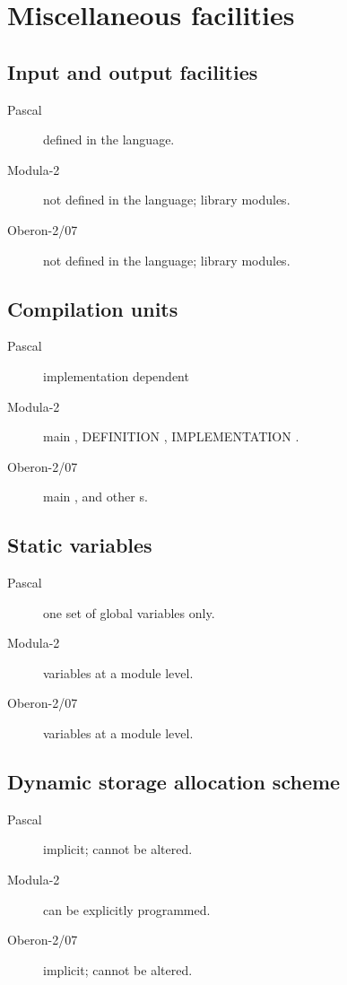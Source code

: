 \documentclass[10pt]{article}
\begin{document}
\section{Miscellaneous facilities}

\subsection{Input and output facilities}
\begin{description}
    \item[Pascal] defined in the language.
    
    \item[Modula-2] not defined in the language; library modules.
    
    \item[Oberon-2/07] not defined in the language; library modules.
\end{description}

\subsection{Compilation units}
\begin{description}
    \item[Pascal] implementation dependent
    
    \item[Modula-2] main \MODULE, DEFINITION \MODULE, IMPLEMENTATION \MODULE.
    
    \item[Oberon-2/07] main \MODULE, and other  \MODULE s.
\end{description}

\subsection{Static variables}
\begin{description}
    \item[Pascal]  one set of global variables only.
    
    \item[Modula-2] variables at a module level.
    
    \item[Oberon-2/07] variables at a module level.
\end{description}

\subsection{Dynamic storage allocation scheme}
\begin{description}
    \item[Pascal] implicit; cannot be altered.
    
    \item[Modula-2] can be explicitly programmed.
    
    \item[Oberon-2/07] implicit; cannot be altered.
\end{description}
\end{document}
